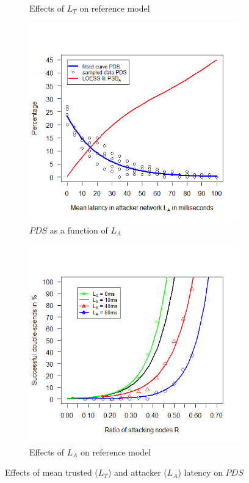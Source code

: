 \documentclass[a4paper,12pt,twoside]{report}
\begin{document}
\begin{figure}[!ht]
\begin{subfigure}{.481\textwidth}
  \caption{Effects of $L_{T}$ on reference model}
  \label{trulat:b}
\end{subfigure}
\begin{subfigure}{.481\textwidth}
  \centering
  \includegraphics[width=\linewidth]{Experiments/AttLatency/attlat.png}
  \caption{$PDS$ as a function of $L_{A}$}
  \label{attlat:a}
\end{subfigure}%
\begin{subfigure}{.481\textwidth}
  \centering
  \includegraphics[width=\linewidth]{Experiments/AttLatency/attrat.png}
  \caption{Effects of $L_{A}$ on reference model}
  \label{attlat:b}
\end{subfigure}
\caption{Effects of mean trusted ($L_{T}$) and attacker ($L_{A}$) latency on $PDS$}
\label{latplot}
\end{figure}
\end{document}
